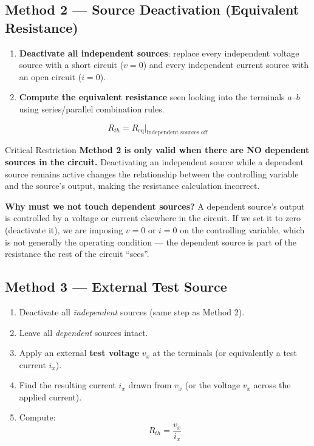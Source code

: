 \documentclass[twoside]{article}
\begin{document}
\subsection{Method 2 — Source Deactivation (Equivalent Resistance)}

\begin{enumerate}
    \item \textbf{Deactivate all independent sources}: replace every independent voltage source with a short circuit ($v = 0$) and every independent current source with an open circuit ($i = 0$).
    \item \textbf{Compute the equivalent resistance} seen looking into the terminals $a$--$b$ using series/parallel combination rules.
\end{enumerate}

\[
    R_{th} = R_{\text{eq}}\big|_{\text{independent sources off}}
\]

\begin{redbox}{Critical Restriction}
\textbf{Method 2 is only valid when there are NO dependent sources in the circuit.}  Deactivating an independent source while a dependent source remains active changes the relationship between the controlling variable and the source's output, making the resistance calculation incorrect.
\end{redbox}

\textbf{Why must we not touch dependent sources?}  A dependent source's output is controlled by a voltage or current elsewhere in the circuit.  If we set it to zero (deactivate it), we are imposing $v = 0$ or $i = 0$ on the controlling variable, which is not generally the operating condition — the dependent source is part of the resistance the rest of the circuit ``sees''.

\subsection{Method 3 — External Test Source}

\begin{enumerate}
    \item Deactivate all \emph{independent} sources (same step as Method 2).
    \item Leave all \emph{dependent} sources intact.
    \item Apply an external \textbf{test voltage} $v_x$ at the terminals (or equivalently a test current $i_x$).
    \item Find the resulting current $i_x$ drawn from $v_x$ (or the voltage $v_x$ across the applied current).
    \item Compute:
    \[
        \boxed{R_{th} = \frac{v_x}{i_x}}
    \]
\end{enumerate}
\end{document}
